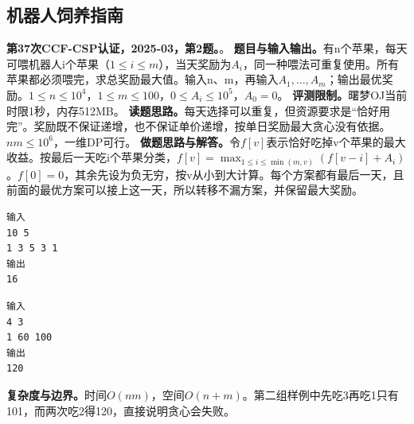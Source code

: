 \subsection{机器人饲养指南}
\textbf{第37次CCF-CSP认证，2025-03，第2题。}。
\textbf{题目与输入输出。}有n个苹果，每天可喂机器人i个苹果（$1\le i\le m$），当天奖励为$A_i$，同一种喂法可重复使用。所有苹果都必须喂完，求总奖励最大值。输入n、m，再输入$A_1,\ldots,A_m$；输出最优奖励。$1\le n\le10^4$，$1\le m\le100$，$0\le A_i\le10^5$，$A_0=0$。
\textbf{评测限制。}曙梦OJ当前时限1秒，内存512MB。
\textbf{读题思路。}每天选择可以重复，但资源要求是“恰好用完”。奖励既不保证递增，也不保证单价递增，按单日奖励最大贪心没有依据。$nm\le10^6$，一维DP可行。
\textbf{做题思路与解答。}令$f[v]$表示恰好吃掉v个苹果的最大收益。按最后一天吃i个苹果分类，$f[v]=\max_{1\le i\le\min(m,v)}(f[v-i]+A_i)$。$f[0]=0$，其余先设为负无穷，按v从小到大计算。每个方案都有最后一天，且前面的最优方案可以接上这一天，所以转移不漏方案，并保留最大奖励。
\begin{verbatim}
输入
10 5
1 3 5 3 1
输出
16
\end{verbatim}
\begin{verbatim}
输入
4 3
1 60 100
输出
120
\end{verbatim}
\textbf{复杂度与边界。}时间$O(nm)$，空间$O(n+m)$。第二组样例中先吃3再吃1只有101，而两次吃2得120，直接说明贪心会失败。
